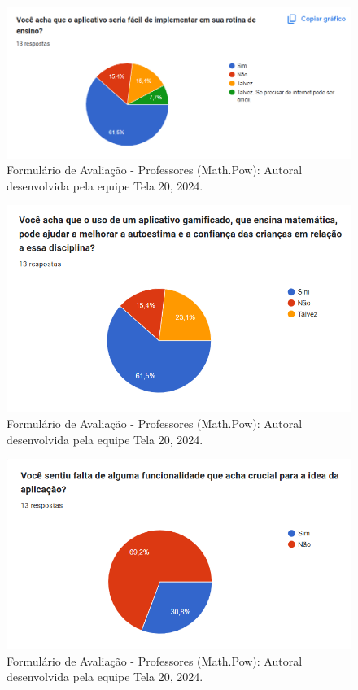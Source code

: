 \documentclass[12pt, openany, oneside, a4paper, english, brazil]{abntex2}   %
\begin{document}
\begin{figure}
    \centering
    \includegraphics[width=0.9\linewidth]{figuras/Formulário Gráficos/Professores/13 voce acha que o aplicativo seria facil de implementar em sua rotina de ensino.png}
    \caption{Formulário de Avaliação - Professores (Math.Pow):  Autoral desenvolvida pela equipe Tela 20, 2024.}
    \label{gráfico gerado pelo formulário}
\end{figure}

\begin{figure}
    \centering
    \includegraphics{figuras/Formulário Gráficos/Professores/14 Você acha que o uso de um aplicativo gamificado.png}
    \caption{Formulário de Avaliação - Professores (Math.Pow):  Autoral desenvolvida pela equipe Tela 20, 2024.}
    \label{gráfico gerado pelo formulário}
\end{figure}

\begin{figure}
    \centering
    \includegraphics{figuras/Formulário Gráficos/Professores/15 Voce sentiu falta de alguma funcionalidade que acha crucial.png}
    \caption{Formulário de Avaliação - Professores (Math.Pow):  Autoral desenvolvida pela equipe Tela 20, 2024.}
    \label{gráfico gerado pelo formulário}
\end{figure}
\end{document}
